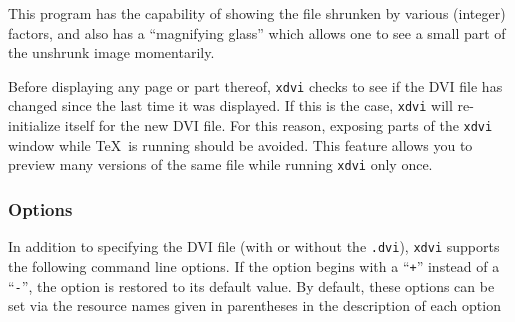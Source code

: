 This program has the capability of showing the file shrunken by various
(integer) factors, and also has a ``magnifying glass'' which allows one
to see a small part of the unshrunk image momentarily.

Before displaying any page or part thereof, \verb+xdvi+ checks to see if the
DVI file  has changed since the last time it was displayed. If this is the
case, \verb+xdvi+  will re-initialize itself for the new DVI file. For this
reason, exposing parts  of the \verb+xdvi+ window while \TeX\ is running should
be avoided. This feature  allows you to preview many versions of the same file
while running \verb+xdvi+ only  once.

\subsubsection{Options}
\label{se:dvixdvioptions}
In addition to specifying the DVI file (with or without the {\tt .dvi}),
\verb+xdvi+ supports the following command line options.
If the option begins with a ``{\tt+}'' instead of a ``{\tt-}'',
the option is restored to its default value.  By default, these options can
be set via the resource names given in parentheses in the description of
each option
